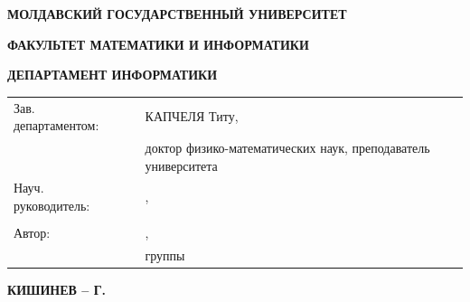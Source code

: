 \begin{titlepage}
  \titlePageDefaultFont
  \vspace*{\fill}
  \begin{center}
    \vspace*{1cm}

    {\titlePageEmphasisFont
    \uppercase{\textbf{МОЛДАВСКИЙ ГОСУДАРСТВЕННЫЙ УНИВЕРСИТЕТ\\}}}

    \uppercase{\textbf{ФАКУЛЬТЕТ МАТЕМАТИКИ И ИНФОРМАТИКИ}}
    \vspace{0.1cm}

    \uppercase{\textbf{ДЕПАРТАМЕНТ ИНФОРМАТИКИ}}
    \vspace{3.0cm}

    {\titlePageEmphasisFont
    \textbf{\correctName{\authorNameRu}}}
    \vspace{1.5cm}

    {\titlePageEmphasisFont
    }
    \vspace{0.75cm}

    \textbf{\MakeUppercase{\identificatorulCursuluiRu{}}}
    \vspace{0.5cm}


  \end{center}
  \vfill

  \begin{flushleft}
    \newcommand{\signatureField}{\textUnderLine{4cm}{(подпись)}}

    \begin{tabular}{@{}p{4.4cm} p{4cm} p{8cm}@{}}
      Зав. департаментом: & \signatureField{} & КАПЧЕЛЯ Титу, \\
                                &                   & доктор физико-математических наук, преподаватель университета \\
      Науч. руководитель:     & \signatureField{} & \correctName{\conducatorNameRu}, \\
                                &                   & \conducatorTitleRu{} \\
      Автор:                    & \signatureField{} & \correctName{\authorNameRu}, \\
                                &                   & \studentTypeRu{} группы \uniGroupName{} \\
    \end{tabular}

  \end{flushleft}

  \vspace{1cm}

  \begin{center}
    \textbf{КИШИНЕВ -- \yearOfWriting{} Г.}
  \end{center}

\end{titlepage}
